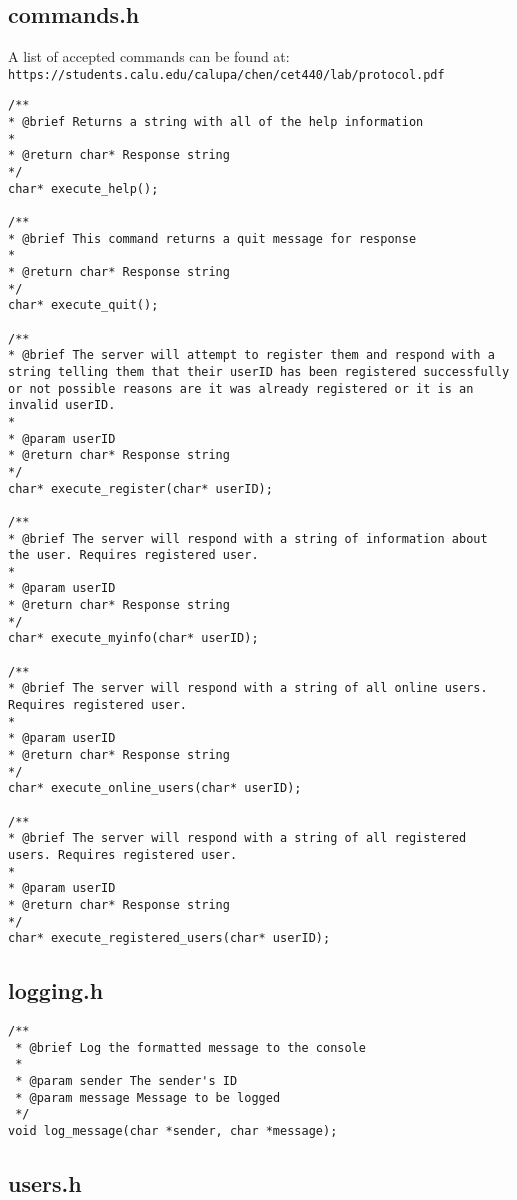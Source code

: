 \documentclass{article}
\newcommand{\code}[1]{\colorbox{codegray}{\texttt{#1}}}
\begin{document}
\subsection*{commands.h}

A list of accepted commands can be found at: \code{https://students.calu.edu/calupa/chen/cet440/lab/protocol.pdf}

\begin{lstlisting}[style=CStyle]
/**
* @brief Returns a string with all of the help information
* 
* @return char* Response string
*/
char* execute_help();

/**
* @brief This command returns a quit message for response
* 
* @return char* Response string
*/
char* execute_quit();

/**
* @brief The server will attempt to register them and respond with a string telling them that their userID has been registered successfully or not possible reasons are it was already registered or it is an invalid userID.
* 
* @param userID 
* @return char* Response string
*/
char* execute_register(char* userID);

/**
* @brief The server will respond with a string of information about the user. Requires registered user.
* 
* @param userID 
* @return char* Response string
*/
char* execute_myinfo(char* userID);

/**
* @brief The server will respond with a string of all online users. Requires registered user.
* 
* @param userID 
* @return char* Response string
*/
char* execute_online_users(char* userID);

/**
* @brief The server will respond with a string of all registered users. Requires registered user.
* 
* @param userID 
* @return char* Response string
*/
char* execute_registered_users(char* userID);  
\end{lstlisting}


\subsection*{logging.h}

\begin{lstlisting}[style=CStyle]
/**
 * @brief Log the formatted message to the console
 * 
 * @param sender The sender's ID
 * @param message Message to be logged
 */
void log_message(char *sender, char *message);
\end{lstlisting}

\pagebreak
\subsection*{users.h}
\end{document}
